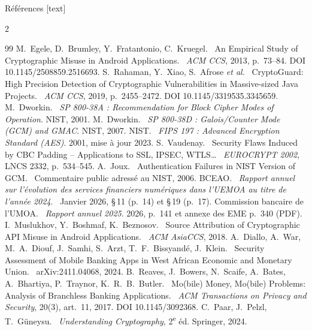 \documentclass[aspectratio=169,10pt]{beamer}
\begin{document}
\begin{frame}{Références}
  [text]
  \tiny
  \begin{multicols}{2}
  \begin{thebibliography}{99}\setlength{\itemsep}{2pt}\renewcommand{\newblock}{\ }
     M.~Egele, D.~Brumley, Y.~Fratantonio, C.~Kruegel.
      \newblock An Empirical Study of Cryptographic Misuse in Android Applications.
      \newblock \emph{ACM CCS}, 2013, p.~73--84. DOI 10.1145/2508859.2516693.
     S.~Rahaman, Y.~Xiao, S.~Afrose \emph{et al.}
      \newblock CryptoGuard: High Precision Detection of Cryptographic Vulnerabilities in Massive-sized Java Projects.
      \newblock \emph{ACM CCS}, 2019, p.~2455--2472. DOI 10.1145/3319535.3345659.
     M.~Dworkin.
      \newblock \emph{SP 800-38A : Recommendation for Block Cipher Modes of Operation}. NIST, 2001.
     M.~Dworkin.
      \newblock \emph{SP 800-38D : Galois/Counter Mode (GCM) and GMAC}. NIST, 2007.
     NIST.
      \newblock \emph{FIPS 197 : Advanced Encryption Standard (AES)}. 2001, mise à jour 2023.
     S.~Vaudenay.
      \newblock Security Flaws Induced by CBC Padding -- Applications to SSL, IPSEC, WTLS\ldots
      \newblock \emph{EUROCRYPT 2002}, LNCS 2332, p.~534--545.
     A.~Joux.
      \newblock Authentication Failures in NIST Version of GCM.
      \newblock Commentaire public adressé au NIST, 2006.
     BCEAO.
      \newblock \emph{Rapport annuel sur l'évolution des services financiers numériques dans l'UEMOA au titre de l'année 2024}.
      \newblock Janvier 2026, \S\,11 (p.~14) et \S\,19 (p.~17).
     Commission bancaire de l'UMOA.
      \newblock \emph{Rapport annuel 2025}. 2026, p.~141 et annexe des EME p.~340 (PDF).
     I.~Muslukhov, Y.~Boshmaf, K.~Beznosov.
      \newblock Source Attribution of Cryptographic API Misuse in Android Applications.
      \newblock \emph{ACM AsiaCCS}, 2018.
     A.~Diallo, A.~War, M.~A.~Diouf, J.~Samhi, S.~Arzt, T.~F.~Bissyandé, J.~Klein.
      \newblock Security Assessment of Mobile Banking Apps in West African Economic and Monetary Union.
      \newblock arXiv:2411.04068, 2024.
     B.~Reaves, J.~Bowers, N.~Scaife, A.~Bates, A.~Bhartiya, P.~Traynor, K.~R.~B.~Butler.
      \newblock Mo(bile) Money, Mo(bile) Problems: Analysis of Branchless Banking Applications.
      \newblock \emph{ACM Transactions on Privacy and Security}, 20(3), art.~11, 2017. DOI 10.1145/3092368.
     C.~Paar, J.~Pelzl, T.~Güneysu.
      \newblock \emph{Understanding Cryptography}, 2\textsuperscript{e} éd. Springer, 2024.
  \end{thebibliography}
  \end{multicols}
\end{frame}
\end{document}

